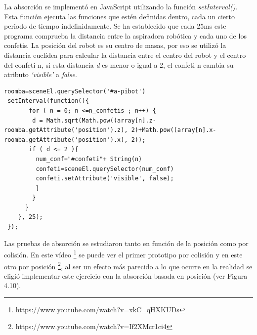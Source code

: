 La absorción se implementó en JavaScript utilizando la función \textit{setInterval()}. Esta función ejecuta las funciones que estén definidas dentro, cada un cierto periodo de tiempo indefinidamente.
Se ha establecido que cada 25ms este programa comprueba la distancia entre la aspiradora robótica y cada uno de los confetis. La posición del robot es su centro de masas, por eso se  utilizó la distancia euclídea para calcular la distancia entre el centro del robot y el centro del confeti n, si esta distancia \textit{d} es menor o igual a 2, el confeti n cambia su atributo \textit{`visible'} a \textit{false}. 

\begin{lstlisting}
roomba=sceneEl.querySelector('#a-pibot')
 setInterval(function(){
       for ( n = 0; n <=n_confetis ; n++) {
        d = Math.sqrt(Math.pow((array[n].z-roomba.getAttribute('position').z), 2)+Math.pow((array[n].x-roomba.getAttribute('position').x), 2));
       if ( d <= 2 ){
         num_conf="#confeti"+ String(n)
         confeti=sceneEl.querySelector(num_conf)
         confeti.setAttribute('visible', false);
         }
        }
      }
    }, 25);
 });
\end{lstlisting}

Las pruebas de absorción se estudiaron tanto en función de la posición como por colisión. En este vídeo \footnote{https://www.youtube.com/watch?v=xkC\_qHXKUDs} se puede ver el primer prototipo por colisión y en este otro por posición \footnote{https://www.youtube.com/watch?v=If2XMcr1ci4}, al ser un efecto más parecido a lo que ocurre en la realidad se eligió implementar este ejercicio con la absorción basada en posición (ver Figura 4.10).

